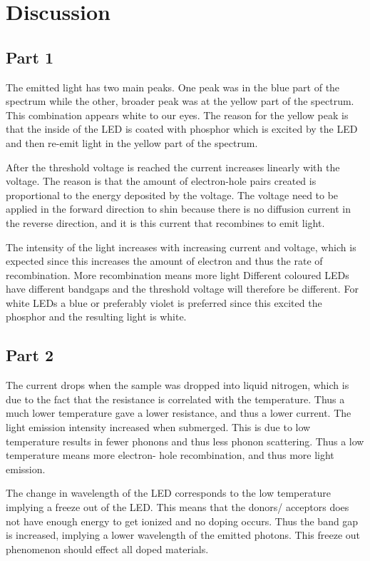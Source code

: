 \section{Discussion}
\subsection{Part 1}
The emitted light has two main peaks. One peak was in the blue part of the spectrum while the other, broader peak was at the yellow part of the spectrum. This combination appears white to our eyes. The reason for the yellow peak is that the inside of the LED is coated with phosphor which is excited by the LED and then re-emit light in the yellow part of the spectrum.

After the threshold voltage is reached the current increases linearly with the voltage. The reason is that the amount of electron-hole pairs created is proportional to the energy deposited by the voltage. The voltage need to be applied in the forward direction to shin because there is no diffusion current in the reverse direction, and it is this current that recombines to emit light.

The intensity of the light increases with increasing current and voltage, which is expected since this increases the amount of electron and thus the rate of recombination. More recombination means more light Different coloured LEDs have different bandgaps and the threshold voltage will therefore be different. For white LEDs a blue or preferably violet is preferred since this excited the phosphor and the resulting light is white.

\subsection{Part 2}
The current drops when the sample was dropped into liquid nitrogen, which is due to the fact that the resistance is correlated with the temperature. Thus a much lower temperature gave a lower resistance, and thus a lower current. The light emission intensity increased when submerged. This is due to low temperature results in fewer phonons and thus less phonon scattering. Thus a low temperature means more electron- hole recombination, and thus more light emission. 

The change in wavelength of the LED corresponds to the low temperature implying a freeze out of the LED. This means that the donors/ acceptors does not have enough energy to get ionized and no doping occurs. Thus the band gap is increased, implying a lower wavelength of the emitted photons. This freeze out phenomenon should effect all doped materials. 


